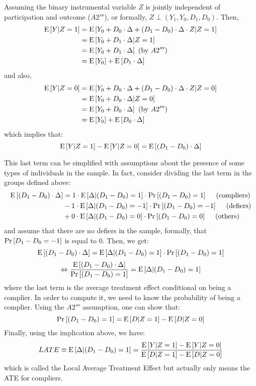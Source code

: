 Assuming the binary instrumental variable $Z$ is jointly independent of participation and outcome ($A2'''$), or formally, $Z\perp (Y_1,Y_0,D_1,D_0)$. Then, \begin{align*}
\operatorname{E}\left[Y\vert Z=1\right] & = \operatorname{E}\left[Y_0 + D_0\cdot \Delta + (D_1 - D_0)\cdot \Delta\cdot Z\vert Z=1\right] \\
& = \operatorname{E}\left[Y_0 + D_1\cdot \Delta \vert Z=1\right] \\
& = \operatorname{E}\left[Y_0 + D_1\cdot \Delta\right] \text{ (by } A2''')\\
& = \operatorname{E}\left[Y_0\right] + \operatorname{E}\left[D_1\cdot \Delta\right]
\end{align*}
and also,
\begin{align*}
\operatorname{E}\left[Y\vert Z=0\right] & = \operatorname{E}\left[Y_0 + D_0\cdot \Delta + (D_1 - D_0)\cdot \Delta\cdot Z\vert Z=0\right] \\
& = \operatorname{E}\left[Y_0 + D_0\cdot \Delta 
\vert Z=0\right] \\
& = \operatorname{E}\left[Y_0 + D_0\cdot \Delta\right] \text{ (by } A2''')\\
& = \operatorname{E}\left[Y_0\right] + \operatorname{E}\left[D_0\cdot \Delta\right]
\end{align*}
which implies that: $$ \operatorname{E}\left[Y\vert Z=1\right] - \operatorname{E}\left[Y\vert Z=0\right] = \operatorname{E}\left[(D_1 - D_0)\cdot \Delta\right] $$

This last term can be simplified with assumptions about the presence of some types of individuals in the sample. In fact, consider dividing the last term in the groups defined above: \begin{align*}
\operatorname{E}\left[(D_1 - D_0)\cdot \Delta\right] & = 1 \cdot \operatorname{E}\left[\Delta\vert(D_1 - D_0)=1\right] \cdot \operatorname{Pr}\left[(D_1 - D_0)=1\right] \quad \text{ (compliers)}\\
& - 1 \cdot \operatorname{E}\left[\Delta\vert(D_1 - D_0)=-1\right] \cdot \operatorname{Pr}\left[(D_1 - D_0)=-1\right] \quad \text{ (defiers)}\\
& + 0 \cdot \operatorname{E}\left[\Delta\vert(D_1 - D_0)=0\right] \cdot \operatorname{Pr}\left[(D_1 - D_0)=0\right] \quad \text{ (others)}
\end{align*}
and assume that there are no defiers in the sample, formally, that $\operatorname{Pr}\left[D_1 - D_0=-1\right]$ is equal to 0. Then, we get: $$\operatorname{E}\left[(D_1 - D_0)\cdot \Delta\right] = \operatorname{E}\left[\Delta\vert(D_1 - D_0)=1\right] \cdot \operatorname{Pr}\left[(D_1 - D_0)=1\right] $$
$$\Leftrightarrow \frac{\operatorname{E}\left[(D_1 - D_0)\cdot \Delta\right]}{\operatorname{Pr}\left[(D_1 - D_0)=1\right]} = \operatorname{E}\left[\Delta\vert(D_1 - D_0)=1\right] $$ where the last term is the average treatment effect conditional on being a complier. In order to compute it, we need to know the probability of being a complier. Using the $A2'''$ assumption, one can show that: $$
\operatorname{Pr}\left[(D_1 - D_0)=1\right] = \operatorname{E}\left[D\vert Z=1\right] - \operatorname{E}\left[D\vert Z=0\right] $$ Finally, using the implication above, we have: $$LATE\equiv \operatorname{E}\left[\Delta\vert(D_1 - D_0)=1\right] = \frac{\operatorname{E}\left[Y\vert Z=1\right] - \operatorname{E}\left[Y\vert Z=0\right]}{\operatorname{E}\left[D\vert Z=1\right] - \operatorname{E}\left[D\vert Z=0\right]} $$ which is called the Local Average Treatment Effect but actually only means the ATE for compliers.

